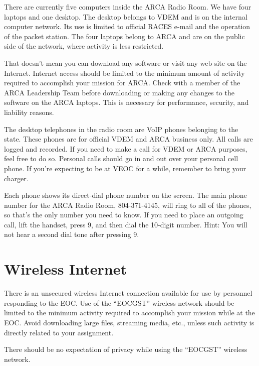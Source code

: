 \documentclass[pdflatex,letterpaper,twoside,12pt]{book}
\begin{document}
There are currently five computers inside the ARCA Radio Room.  We have four laptops and one desktop.  The desktop belongs to VDEM and is on the internal computer network.  Its use is limited to official RACES e-mail and the operation of the packet station.  The four laptops belong to ARCA and are on the public side of the network, where activity is less restricted.

That doesn't mean you can download any software or visit any web site on the Internet.  Internet access should be limited to the minimum amount of activity required to accomplish your mission for ARCA.  Check with a member of the ARCA Leadership Team before downloading or making any changes to the software on the ARCA laptops.  This is necessary for performance, security, and liability reasons.

The desktop telephones in the radio room are VoIP phones belonging to the state.  These phones are for official VDEM and ARCA business only.  All calls are logged and recorded.  If you need to make a call for VDEM or ARCA purposes, feel free to do so.  Personal calls should go in and out over your personal cell phone.  If you're expecting to be at VEOC for a while, remember to bring your charger.

Each phone shows its direct-dial phone number on the screen.  The main phone number for the ARCA Radio Room, 804-371-4145, will ring to all of the phones, so that's the only number you need to know.  If you need to place an outgoing call, lift the handset, press 9, and then dial the 10-digit number.  Hint: You will not hear a second dial tone after pressing 9.


\section{Wireless Internet}

There is an unsecured wireless Internet connection available for use by personnel responding to the EOC.  Use of the ``EOCGST'' wireless network should be limited to the minimum activity required to accomplish your mission while at the EOC.  Avoid downloading large files, streaming media, etc., unless such activity is directly related to your assignment.

There should be no expectation of privacy while using the ``EOCGST'' wireless network.
\end{document}

